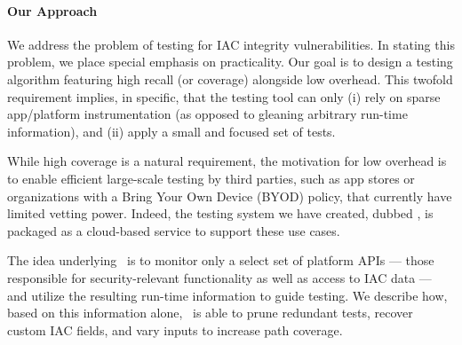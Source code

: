%

\paragraph{Our Approach} We address the problem of testing for IAC integrity vulnerabilities. In stating this problem, we place special emphasis on practicality. Our goal is to design a testing algorithm featuring high recall (or coverage) alongside low overhead. This twofold requirement implies, in specific, that the testing tool can only (i) rely on sparse app/platform instrumentation (as opposed to gleaning arbitrary run-time information), and (ii) apply a small and focused set of tests.

While high coverage is a natural requirement, the motivation for low overhead is to enable efficient large-scale testing by third parties, such as app stores or organizations with a Bring Your Own Device (BYOD) policy, that currently have limited vetting power. Indeed, the testing system we have created, dubbed \Tool, is packaged as a cloud-based service to support these use cases.

The idea underlying \Tool\ is to monitor only a select set of platform APIs --- those responsible for security-relevant functionality as well as access to IAC data --- and utilize the resulting run-time information to guide testing. We describe how, based on this information alone, \Tool\ is able to prune redundant tests, recover custom IAC fields, and vary inputs to increase path coverage.  

